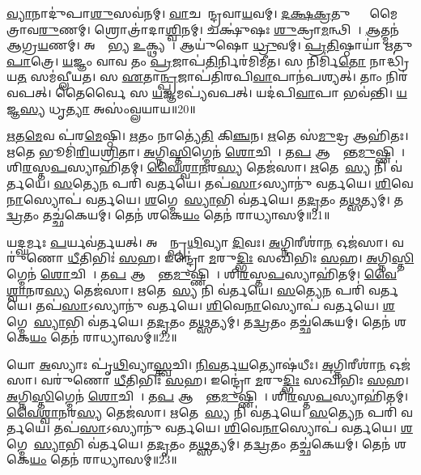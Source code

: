 \ul{𑌵𑍍𑌯𑌾}𑌨𑌾𑌦𑍁॑𑌪𑌾\ul{𑌶𑍁}𑌸𑌵॑𑌨𑌮𑍍।
\ul{𑌵𑌾}𑌚 𑌐᳚𑌨𑍍𑌦𑍍𑌰𑌵𑌾\ul{𑌯}𑌵𑌮𑍍।
\ul{𑌦}\ul{𑌕𑍍𑌷}\ul{𑌕𑍍𑌰}𑌤𑍁𑌭𑍍𑌯𑌾𑌂᳚ 𑌮𑍈𑌤𑍍𑌰𑌾𑌵\ul{𑌰𑍁}𑌣𑌮𑍍।
𑌶𑍍𑌰𑍋𑌤𑍍𑌰𑌾॑𑌦𑌾\ul{𑌶𑍍𑌵𑌿}𑌨𑌮𑍍।
𑌚𑌕𑍍𑌷𑍁॑𑌷𑌃 \ul{𑌶𑍁}𑌕𑍍𑌰𑌾\ul{𑌮}𑌨𑍍𑌥𑌿𑌨𑍗᳚।
\ul{𑌆}𑌤𑍍𑌮𑌨॑ 𑌆𑌗𑍍𑌰\ul{𑌯}𑌣𑌮𑍍।
𑌅𑌙𑍍𑌗𑍇᳚𑌭𑍍𑌯 \ul{𑌉}𑌕𑍍𑌥𑍍𑌯𑌮𑍍᳚।
𑌆𑌯𑍁॑𑌷𑍋 \ul{𑌧𑍍𑌰𑍁}𑌵𑌮𑍍।
\ul{𑌪𑍍𑌰}\ul{𑌤𑌿}𑌷𑍍𑌠𑌾𑌯𑌾॑ 𑌋𑌤𑍁\ul{𑌪𑌾}𑌤𑍍𑌰𑍇।
\ul{𑌯}𑌜𑍍𑌞𑌂 𑌵𑌾𑌵 𑌤𑌂 \ul{𑌪𑍍𑌰}𑌜𑌾𑌪॑\ul{𑌤𑌿}𑌰𑍍𑌨𑌿𑌰॑𑌮𑌿𑌮𑍀𑌤।
𑌸 𑌨𑌿𑌰𑍍𑌮𑌿॑\ul{𑌤𑍋} 𑌨𑌾𑌦𑍍𑌧𑍍𑌰𑌿॑𑌯\ul{𑌤} 𑌸𑌮॑𑌵𑍍𑌲𑍀𑌯𑌤।
𑌸 \ul{𑌏}𑌤𑌾\ul{𑌨𑍍𑌪𑍍𑌰}𑌜𑌾𑌪॑𑌤𑌿𑌰𑌪𑌿\ul{𑌵𑌾}𑌪𑌾𑌨॑𑌪𑌶𑍍𑌯𑌤𑍍।
𑌤𑌾𑌂 𑌨𑌿𑌰॑𑌵𑌪𑌤𑍍।
𑌤𑍈𑌰𑍍𑌵𑍈 𑌸 \ul{𑌯}𑌜𑍍𑌞𑌮𑌪𑍍𑌯॑𑌵𑌪𑌤𑍍।
𑌯𑌦॑𑌪𑌿\ul{𑌵𑌾}𑌪𑌾 𑌭𑌵॑𑌨𑍍𑌤𑌿।
\ul{𑌯}𑌜𑍍𑌞\ul{𑌸𑍍𑌯} 𑌧𑍃\ul{𑌤𑍍𑌯𑌾} 𑌅𑌸𑌂॑𑌵𑍍𑌲𑌯𑌾𑌯॥20॥\anuvakamend[\ul{𑌉}\ul{𑌪𑌾}\ul{\dng{ꣳ}}\ul{𑌶𑍍𑌵}\ul{𑌨𑍍𑌤}\ul{𑌰𑍍𑌯𑌾}𑌮𑍗 𑌨𑌿𑌰॑𑌮𑌿𑌮𑍀𑌤𑌾𑌮𑌿𑌮𑍀\ul{𑌤} 𑌷𑌟𑍍𑌚॑]

\ul{𑌋}𑌤\ul{𑌮𑍇}𑌵 𑌪॑𑌰\ul{𑌮𑍇}𑌷𑍍𑌠𑌿।
\ul{𑌋}𑌤𑌂 𑌨𑌾𑌤𑍍𑌯𑍇॑\ul{𑌤𑌿} 𑌕𑌿\ul{𑌞𑍍𑌚}𑌨।
\ul{𑌋}𑌤𑍇 𑌸॑\ul{𑌮𑍁}𑌦𑍍𑌰 𑌆𑌹𑌿॑𑌤𑌃।
\ul{𑌋}𑌤𑍇 𑌭𑍂𑌮𑌿॑\ul{𑌰𑌿}𑌯\ul{𑌶𑍍𑌰𑌿}𑌤𑌾।
\ul{𑌅}𑌗𑍍𑌨𑌿\ul{𑌸𑍍𑌤𑌿}𑌗𑍍𑌮𑍇𑌨॑ \ul{𑌶𑍋}𑌚𑌿𑌷𑌾᳚।
𑌤\ul{𑌪} 𑌆𑌕𑍍𑌰𑌾᳚𑌨𑍍𑌤\ul{𑌮𑍁}𑌷𑍍𑌣𑌿𑌹𑌾᳚।
𑌶𑌿\ul{𑌰}𑌸𑍍𑌤\ul{𑌪}𑌸𑍍𑌯𑌾𑌹𑌿॑𑌤𑌮𑍍।
\ul{𑌵𑍈}\ul{𑌶𑍍𑌵𑌾}\ul{𑌨}𑌰\ul{𑌸𑍍𑌯} 𑌤𑍇𑌜॑𑌸𑌾।
\ul{𑌋}𑌤𑍇𑌨𑌾᳚\ul{𑌸𑍍𑌯} 𑌨𑌿 𑌵॑𑌰𑍍𑌤𑌯𑍇।
\ul{𑌸}𑌤𑍍𑌯𑍇\ul{𑌨} 𑌪𑌰𑌿॑ 𑌵𑌰𑍍𑌤𑌯𑍇।
𑌤𑌪॑\ul{𑌸𑌾}\-𑌽𑌸𑍍𑌯𑌾𑌨𑍁॑ 𑌵𑌰𑍍𑌤𑌯𑍇।
\ul{𑌶𑌿}𑌵𑍇\ul{𑌨𑌾}𑌸𑍍𑌯𑍋𑌪॑ 𑌵𑌰𑍍𑌤𑌯𑍇।
\ul{𑌶}𑌗𑍍𑌮𑍇𑌨𑌾᳚\ul{𑌸𑍍𑌯𑌾}𑌭𑌿 𑌵॑𑌰𑍍𑌤𑌯𑍇।
𑌤\ul{𑌦𑍃}𑌤𑌂 𑌤\ul{𑌥𑍍𑌸}𑌤𑍍𑌯𑌮𑍍।
𑌤\ul{𑌦𑍍𑌵𑍍𑌰}𑌤𑌂 𑌤𑌚𑍍𑌛॑𑌕𑍇𑌯𑌮𑍍।
𑌤𑍇𑌨॑ 𑌶𑌕𑍇\ul{𑌯𑌂} 𑌤𑍇𑌨॑ 𑌰𑌾𑌧𑍍𑌯𑌾𑌸𑌮𑍍॥21॥

𑌯𑌦𑍍\mbox{}\ul{𑌘}𑌰𑍍𑌮𑌃 \ul{𑌪}𑌰𑍍𑌯𑌵॑𑌰𑍍𑌤𑌯𑌤𑍍।
𑌅𑌨𑍍𑌤𑌾᳚𑌨𑍍𑌪𑍃\ul{𑌥𑌿}𑌵𑍍𑌯𑌾 \ul{𑌦𑌿}𑌵𑌃।
\ul{𑌅}𑌗𑍍𑌨𑌿𑌰𑍀𑌶𑌾॑\ul{𑌨} 𑌓𑌜॑𑌸𑌾।
𑌵𑌰𑍁॑𑌣𑍋 \ul{𑌧𑍀}𑌤𑌿𑌭𑌿𑌃॑ \ul{𑌸}𑌹।
𑌇𑌨𑍍𑌦𑍍𑌰𑍋॑ \ul{𑌮}𑌰𑍁\ul{𑌦𑍍𑌭𑌿𑌃} 𑌸𑌖𑌿॑𑌭𑌿𑌃 \ul{𑌸}𑌹।
\ul{𑌅}𑌗𑍍𑌨𑌿\ul{𑌸𑍍𑌤𑌿}𑌗𑍍𑌮𑍇𑌨॑ \ul{𑌶𑍋}𑌚𑌿𑌷𑌾᳚।
𑌤\ul{𑌪} 𑌆𑌕𑍍𑌰𑌾᳚𑌨𑍍𑌤\ul{𑌮𑍁}𑌷𑍍𑌣𑌿𑌹𑌾᳚।
𑌶𑌿\ul{𑌰}𑌸𑍍𑌤\ul{𑌪}𑌸𑍍𑌯𑌾𑌹𑌿॑𑌤𑌮𑍍।
\ul{𑌵𑍈}\ul{𑌶𑍍𑌵𑌾}\ul{𑌨}𑌰\ul{𑌸𑍍𑌯} 𑌤𑍇𑌜॑𑌸𑌾।
\ul{𑌋}𑌤𑍇𑌨𑌾᳚\ul{𑌸𑍍𑌯} 𑌨𑌿 𑌵॑𑌰𑍍𑌤𑌯𑍇।
\ul{𑌸}𑌤𑍍𑌯𑍇\ul{𑌨} 𑌪𑌰𑌿॑ 𑌵𑌰𑍍𑌤𑌯𑍇।
𑌤𑌪॑\ul{𑌸𑌾}\-𑌽𑌸𑍍𑌯𑌾𑌨𑍁॑ 𑌵𑌰𑍍𑌤𑌯𑍇।
\ul{𑌶𑌿}𑌵𑍇\ul{𑌨𑌾}𑌸𑍍𑌯𑍋𑌪॑ 𑌵𑌰𑍍𑌤𑌯𑍇।
\ul{𑌶}𑌗𑍍𑌮𑍇𑌨𑌾᳚\ul{𑌸𑍍𑌯𑌾}𑌭𑌿 𑌵॑𑌰𑍍𑌤𑌯𑍇।
𑌤\ul{𑌦𑍃}𑌤𑌂 𑌤\ul{𑌥𑍍𑌸}𑌤𑍍𑌯𑌮𑍍।
𑌤\ul{𑌦𑍍𑌵𑍍𑌰}𑌤𑌂 𑌤𑌚𑍍𑌛॑𑌕𑍇𑌯𑌮𑍍।
𑌤𑍇𑌨॑ 𑌶𑌕𑍇\ul{𑌯𑌂} 𑌤𑍇𑌨॑ 𑌰𑌾𑌧𑍍𑌯𑌾𑌸𑌮𑍍॥22॥

𑌯𑍋 \ul{𑌅}𑌸𑍍𑌯𑌾𑌃 𑌪𑍃॑\ul{𑌥𑌿}𑌵𑍍𑌯𑌾\ul{𑌸𑍍𑌤𑍍𑌵}𑌚𑌿।
\ul{𑌨𑌿}\ul{𑌵}𑌰𑍍𑌤\ul{𑌯}𑌤𑍍𑌯𑍋𑌷॑𑌧𑍀𑌃।
\ul{𑌅}𑌗𑍍𑌨𑌿𑌰𑍀𑌶𑌾॑\ul{𑌨} 𑌓𑌜॑𑌸𑌾।
𑌵𑌰𑍁॑𑌣𑍋 \ul{𑌧𑍀}𑌤𑌿𑌭𑌿𑌃॑ \ul{𑌸}𑌹।
𑌇𑌨𑍍𑌦𑍍𑌰𑍋॑ \ul{𑌮}𑌰𑍁\ul{𑌦𑍍𑌭𑌿𑌃} 𑌸𑌖𑌿॑𑌭𑌿𑌃 \ul{𑌸}𑌹।
\ul{𑌅}𑌗𑍍𑌨𑌿\ul{𑌸𑍍𑌤𑌿}𑌗𑍍𑌮𑍇𑌨॑ \ul{𑌶𑍋}𑌚𑌿𑌷𑌾᳚।
𑌤\ul{𑌪} 𑌆𑌕𑍍𑌰𑌾᳚𑌨𑍍𑌤\ul{𑌮𑍁}𑌷𑍍𑌣𑌿𑌹𑌾᳚।
𑌶𑌿\ul{𑌰}𑌸𑍍𑌤\ul{𑌪}𑌸𑍍𑌯𑌾𑌹𑌿॑𑌤𑌮𑍍।
\ul{𑌵𑍈}\ul{𑌶𑍍𑌵𑌾}\ul{𑌨}𑌰\ul{𑌸𑍍𑌯} 𑌤𑍇𑌜॑𑌸𑌾।
\ul{𑌋}𑌤𑍇𑌨𑌾᳚\ul{𑌸𑍍𑌯} 𑌨𑌿 𑌵॑𑌰𑍍𑌤𑌯𑍇।
\ul{𑌸}𑌤𑍍𑌯𑍇\ul{𑌨} 𑌪𑌰𑌿॑ 𑌵𑌰𑍍𑌤𑌯𑍇।
𑌤𑌪॑\ul{𑌸𑌾}\-𑌽𑌸𑍍𑌯𑌾𑌨𑍁॑ 𑌵𑌰𑍍𑌤𑌯𑍇।
\ul{𑌶𑌿}𑌵𑍇\ul{𑌨𑌾}𑌸𑍍𑌯𑍋𑌪॑ 𑌵𑌰𑍍𑌤𑌯𑍇।
\ul{𑌶}𑌗𑍍𑌮𑍇𑌨𑌾᳚\ul{𑌸𑍍𑌯𑌾}𑌭𑌿 𑌵॑𑌰𑍍𑌤𑌯𑍇।
𑌤\ul{𑌦𑍃}𑌤𑌂 𑌤\ul{𑌥𑍍𑌸}𑌤𑍍𑌯𑌮𑍍।
𑌤\ul{𑌦𑍍𑌵𑍍𑌰}𑌤𑌂 𑌤𑌚𑍍𑌛॑𑌕𑍇𑌯𑌮𑍍।
𑌤𑍇𑌨॑ 𑌶𑌕𑍇\ul{𑌯𑌂} 𑌤𑍇𑌨॑ 𑌰𑌾𑌧𑍍𑌯𑌾𑌸𑌮𑍍॥23॥

